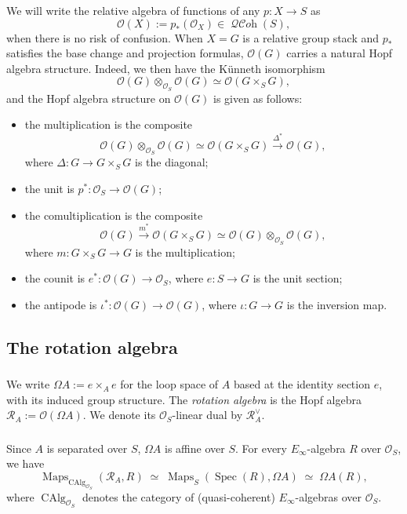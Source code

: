 \documentclass[12pt, oneside]{amsart}
\numberwithin{equation}{section}
\theoremstyle{remark}
\theoremstyle{plain}
\DeclareMathOperator{\QCOH}{\mathcal{QC}\textit{oh}}
\DeclareMathOperator{\Map}{Maps}
\newcommand{\R}{\mathcal{R}}
\newcommand{\RA}{\R_A}
\newcommand{\OO}{\mathcal{O}}
\DeclareMathOperator{\spc}{Spec}
\newcommand{\CAlg}{\operatorname{CAlg}}
\begin{document}
We will write the relative algebra of functions of any $p : X \to S$ as
\[ \OO(X) := p_*(\OO_X) \in \QCOH(S), \]
when there is no risk of confusion.
When $X=G$ is a relative group stack and $p_*$ satisfies the base change and projection formulas, $\OO(G)$ carries a natural Hopf algebra structure.
Indeed, we then have the K\"unneth isomorphism
\[ \OO(G) \otimes_{\OO_S} \OO(G) \simeq \OO(G \times_S G), \]
and the Hopf algebra structure on $\OO(G)$ is given as follows:
\begin{itemize}
  \item the multiplication is the composite
  $$ \OO(G) \otimes_{\OO_S} \OO(G) \simeq \OO(G \times_S G) \xrightarrow{\Delta^*} \OO(G),$$
  where $\Delta : G \to G \times_S G$ is the diagonal;
  \item the unit is $p^* : \OO_S \to \OO(G)$;
  \item the comultiplication is the composite
  $$\OO(G) \xrightarrow{m^*} \OO(G \times_S G) \simeq \OO(G) \otimes_{\OO_S} \OO(G),$$
  where $m : G \times_S G \to G$ is the multiplication;
  \item the counit is $e^* : \OO(G) \to \OO_S$, where $e : S \to G$ is the unit section;
  \item the antipode is $\iota^* : \OO(G) \to \OO(G)$, where $\iota : G \to G$ is the inversion map.
\end{itemize}

\subsection{The rotation algebra}\label{ssec:RA}

\subsubsection{}\label{sssec:RA}

We write $\Omega A := e \times_A e$ for the loop space of $A$ based at the identity section $e$, with its induced group structure.
The \emph{rotation algebra} is the Hopf algebra $\RA := \OO(\Omega A)$.
We denote its $\OO_S$-linear dual by $\RA^\vee$.

\subsubsection{}\label{sssec:maps out of RA}

Since $A$ is separated over $S$, $\Omega A$ is affine over $S$.
For every $E_\infty$-algebra $R$ over $\OO_S$, we have
\begin{equation*}
	\Map_{\CAlg_{\OO_S}}(\RA, R) \;\simeq\; \Map_S(\spc(R), \Omega A) \;\simeq\; \Omega A(R),
\end{equation*}
where $\CAlg_{\OO_S}$ denotes the category of (quasi-coherent) $E_\infty$-algebras over $\OO_S$.
\end{document}
